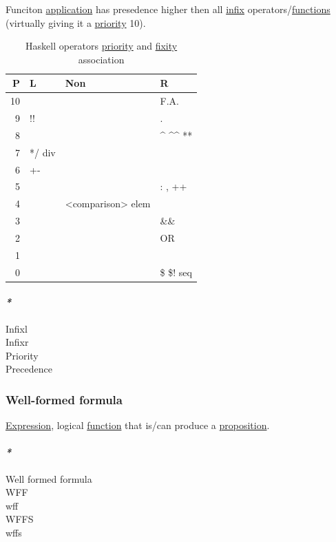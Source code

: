 \documentclass[11pt]{article}
\begin{document}
Funciton \hyperref[orged2f814]{application} has presedence higher then all \hyperref[org80fcea9]{infix} operators/\hyperref[org66c5288]{functions} (virtually giving it a \hyperref[org091696a]{priority} 10).\\

\begin{table}[htbp]
\caption{\label{tab:haskell-operator-priority-fixity-association}Haskell operators \hyperref[org091696a]{priority} and \hyperref[org9303da2]{fixity} association}
\centering
\begin{tabular}{rlll}
P & L & Non & R\\
\hline
10 &  &  & F.A.\\
9 & !! &  & .\\
8 &  &  & \^{} \^{}\^{} **\\
7 & */ div &  & \\
6 & +- &  & \\
5 &  &  & : , ++\\
4 &  & <comparison> elem & \\
3 &  &  & \&\&\\
2 &  &  & OR\\
1 &  &  & \\
0 &  &  & \$ \$! seq\\
\end{tabular}
\end{table}

\paragraph{\emph{*}}
\label{sec:org299403e}

\label{orgb44964a}Infixl\\
\label{orgea78375}Infixr\\
\label{org091696a}Priority\\
\label{orgd18f0db}Precedence\\

\subsubsection{\label{orge4ba01c}Well-formed formula}
\label{sec:orgff5d88c}
\hyperref[org667db83]{Expression}, logical \hyperref[orgeb5cddb]{function} that is/can produce a \hyperref[org78bac32]{proposition}.\\

\paragraph{\emph{*}}
\label{sec:org0098e8c}
\label{org33a2b49}Well formed formula\\
\label{org9e6acda}WFF\\
\label{orgdbf84c6}wff\\
\label{orga7de035}WFFS\\
\label{orgc46232b}wffs\\
\end{document}
